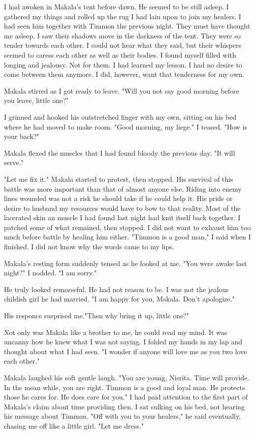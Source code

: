 \documentclass{article}
\begin{document}
I had awoken in Makala's tent before dawn. He seemed to be still asleep. I gathered my things and rolled up the rug I had lain upon to join my healers. I had seen him together with Timmon the previous night. They must have thought me asleep. I saw their shadows move in the darkness of the tent. They were so tender towards each other. I could not hear what they said, but their whispers seemed to caress each other as well as their bodies. I found myself filled with longing and jealousy. Not for them. I had learned my lesson. I had no desire to come between them anymore. I did, however, want that tenderness for my own. 

Makala stirred as I got ready to leave. "Will you not say good morning before you leave, little one?"

I grinned and hooked his outstretched finger with my own, sitting on his bed where he had moved to make room. "Good morning, my liege." I teased. "How is your back?"

Makala flexed the muscles that I had found bloody the previous day. "It will serve."

"Let me fix it." Makala started to protest, then stopped. His survival of this battle was more important than that of almost anyone else. Riding into enemy lines wounded was not a risk he should take if he could help it. His pride or desire to husband my resources would have to bow to that reality. Most of the lacerated skin an muscle I had found last night had knit itself back together. I patched some of what remained, then stopped. I did not want to exhaust him too much before battle by healing him either. "Timmon is a good man," I said when I finished. I did not know why the words came to my lips.

Makala's resting form suddenly tensed as he looked at me. "You were awake last night?" I nodded. "I am sorry." 

He truly looked remorseful. He had not reason to be. I was not the jealous childish girl he had married. "I am happy for you, Makala. Don't apologize."

His responce surprised me."Then why bring it up, little one?" 

Not only was Makala like a brother to me, he could read my mind. It was uncanny how he knew what I was not saying. I folded my hands in my lap and thought about what I had seen. "I wonder if anyone will love me as you two love each other."

Makala laughed his soft gentle laugh. "You are young, Nisrita. Time will provide. In the mean while, you are right. Timmon is a good and loyal man. He protects those he cares for. He does care for you." I had paid attention to the first part of Makala's claim about time providing then. I sat sulking on his bed, not hearing his message about Timmon. "Off with you to your healers," he said eventually, chasing me off like a little girl. "Let me dress."
\end{document}
